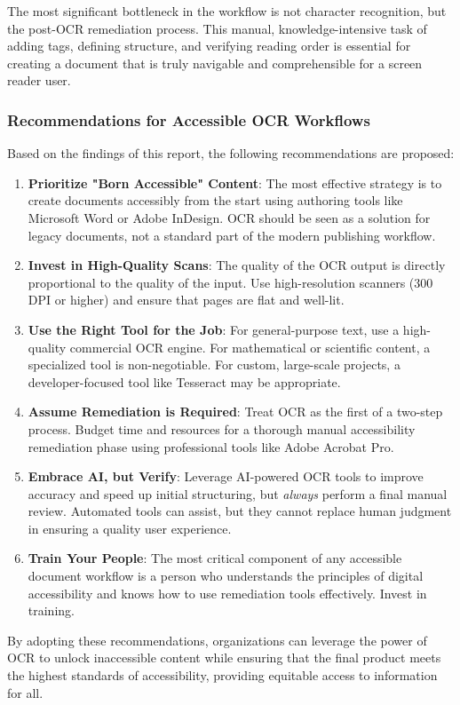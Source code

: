 The most significant bottleneck in the workflow is not character recognition, but the post-OCR remediation process. This manual, knowledge-intensive task of adding tags, defining structure, and verifying reading order is essential for creating a document that is truly navigable and comprehensible for a screen reader user.

\subsubsection{Recommendations for Accessible OCR Workflows}
\label{ssubsec:ocr-recommendations}
Based on the findings of this report, the following recommendations are proposed:
\begin{enumerate}
	\item \textbf{Prioritize "Born Accessible" Content}: The most effective strategy is to create documents accessibly from the start using authoring tools like Microsoft Word or Adobe InDesign. OCR should be seen as a solution for legacy documents, not a standard part of the modern publishing workflow.
	\item \textbf{Invest in High-Quality Scans}: The quality of the OCR output is directly proportional to the quality of the input. Use high-resolution scanners (300 DPI or higher) and ensure that pages are flat and well-lit.
	\item \textbf{Use the Right Tool for the Job}: For general-purpose text, use a high-quality commercial OCR engine. For mathematical or scientific content, a specialized tool is non-negotiable. For custom, large-scale projects, a developer-focused tool like Tesseract may be appropriate.
	\item \textbf{Assume Remediation is Required}: Treat OCR as the first of a two-step process. Budget time and resources for a thorough manual accessibility remediation phase using professional tools like Adobe Acrobat Pro.
	\item \textbf{Embrace AI, but Verify}: Leverage AI-powered OCR tools to improve accuracy and speed up initial structuring, but \textit{always} perform a final manual review. Automated tools can assist, but they cannot replace human judgment in ensuring a quality user experience.
	\item \textbf{Train Your People}: The most critical component of any accessible document workflow is a person who understands the principles of digital accessibility and knows how to use remediation tools effectively. Invest in training.
\end{enumerate}
By adopting these recommendations, organizations can leverage the power of OCR to unlock inaccessible content while ensuring that the final product meets the highest standards of accessibility, providing equitable access to information for all.
